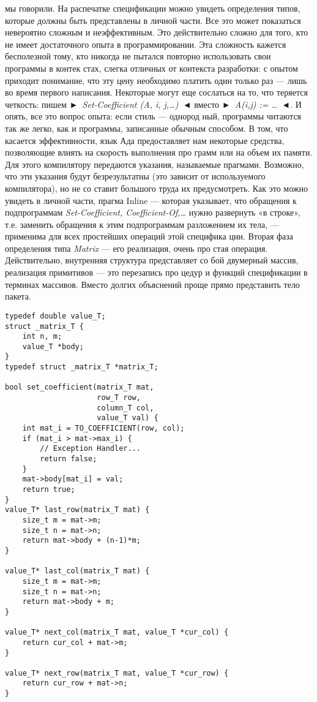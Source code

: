 %
мы говорили. На распечатке спецификации можно увидеть определения
типов, которые должны быть представлены в личной части.
Все это может показаться невероятно сложным и неэффективным.
Это действительно сложно для того, кто не имеет достаточного опыта
в программировании. Эта сложность кажется бесполезной тому, кто
никогда не пытался повторно использовать свои программы в контек­
стах, слегка отличных от контекста разработки: с опытом приходит
понимание, что эту цену необходимо платить один только раз — лишь
во время первого написания. Некоторые могут еще сослаться на то,
что теряется четкость: пишем \textit{►~Set-Coefficient (A, i, j,\dots)~◄} вместо
\textit{►~A(i,j) := \dots~◄}. И опять, все это вопрос опыта: если стиль — однород­
ный, программы читаются так же легко, как и программы, записанные
обычным способом.
В том, что касается эффективности, язык Ада предоставляет нам
некоторые средства, позволяющие влиять на скорость выполнения про­
грамм или на объем их памяти. Для этого компилятору передаются
указания, называемые прагмами. Возможно, что эти указания будут
безрезультатны (это зависит от используемого компилятора), но не со­
ставит большого труда их предусмотреть. Как это можно увидеть в
личной части, прагма Inline — которая указывает, что обращения к
подпрограммам \textit{Set-Coefficient, Coefficient-Of,\dots} нужно развернуть «в
строке», т.е. заменить обращения к этим подпрограммам разложением
их тела, — применима для всех простейших операций этой специфика­
ции.
Вторая фаза определения типа \textit{Matrix} — его реализация, очень про­
стая операция. Действительно, внутренняя структура представляет со­
бой двумерный массив, реализация примитивов — это перезапись про­
цедур и функций спецификации в терминах массивов. Вместо долгих
объяснений проще прямо представить тело пакета.

\begin{lstlisting}
typedef double value_T;
struct _matrix_T {
    int n, m;
    value_T *body;
}
typedef struct _matrix_T *matrix_T;

bool set_coefficient(matrix_T mat,
                     row_T row,
                     column_T col,
                     value_T val) {
    int mat_i = TO_COEFFICIENT(row, col);
    if (mat_i > mat->max_i) {
        // Exception Handler...
        return false;
    }
    mat->body[mat_i] = val;
    return true;
}
value_T* last_row(matrix_T mat) {
    size_t m = mat->m;
    size_t n = mat->n;
    return mat->body + (n-1)*m;
}

value_T* last_col(matrix_T mat) {
    size_t m = mat->m;
    size_t n = mat->n;
    return mat->body + m;
}

value_T* next_col(matrix_T mat, value_T *cur_col) {
    return cur_col + mat->m;
}

value_T* next_row(matrix_T mat, value_T *cur_row) {
    return cur_row + mat->n;
}

\end{lstlisting}

